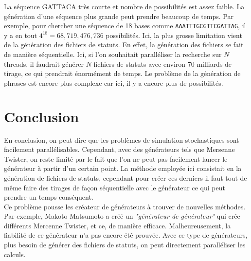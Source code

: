 \documentclass[a4paper]{article}
\begin{document}
La séquence GATTACA très courte et nombre de possibilités est assez faible. La
génération d'une séquence plus grande peut prendre beaucoup de temps. Par
exemple, pour chercher une séquence de 18 bases comme
\texttt{AAATTTGCGTTCGATTAG}, il y a en tout $4^{18} = 68,719,476,736$
possibilités. Ici, la plus grosse limitation vient de la génération des fichiers
de statuts. En effet, la génération des fichiers se fait de manière
séquentielle. Ici, si l'on souhaitait paralléliser la recherche sur $N$ threads,
il faudrait générer $N$ fichiers de statuts avec environ 70 milliards de tirage,
ce qui prendrait énormément de temps. Le problème de la génération de phrases
est encore plus complexe car ici, il y a encore plus de possibilités.

\clearpage
\section{Conclusion}

En conclusion, on peut dire que les problèmes de simulation stochastiques sont
facilement parallélisables. Cependant, avec des générateurs tels que Mersenne
Twister, on reste limité par le fait que l'on ne peut pas facilement lancer le
générateur à partir d'un certain point. La méthode employée ici consistait en la
génération de fichiers de statuts, cependant pour créer ces derniers il faut
tout de même faire des tirages de façon séquentielle avec le générateur ce qui
peut prendre un temps conséquent.\\

Ce problème pousse les créateur de générateurs à trouver de nouvelles méthodes.
Par exemple, Makoto Matsumoto a créé un \textit{"générateur de générateur"} qui
crée différents Mercenne Twister, et ce, de manière efficace. Malheureusement,
la fiabilité de ce générateur n'a pas encore été prouvée. Avec ce type de
générateurs, plus besoin de générer des fichiers de statuts, on peut directement
paralléliser les calculs.
\end{document}
